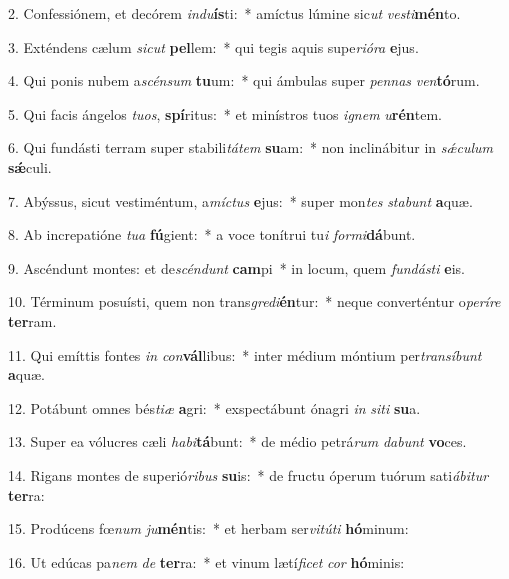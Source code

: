 2. Confessiónem, et decórem \textit{ind}\textit{u}\textbf{ís}ti:~*  amíctus lúmine sic\textit{ut} \textit{ves}\textit{ti}\textbf{mén}to.\

3. Exténdens cælum \textit{sic}\textit{ut} \textbf{pel}lem:~*  qui tegis aquis supe\textit{ri}\textit{ó}\textit{ra} \textbf{e}jus.\

4. Qui ponis nubem a\textit{scén}\textit{sum} \textbf{tu}um:~*  qui ámbulas super \textit{pen}\textit{nas} \textit{ven}\textbf{tó}rum.\

5. Qui facis ángelos \textit{tu}\textit{os}, \textbf{spí}ritus:~*  et minístros tuos \textit{i}\textit{gnem} \textit{u}\textbf{rén}tem.\

6. Qui fundásti terram super stabili\textit{tá}\textit{tem} \textbf{su}am:~*  non inclinábitur in \textit{sǽ}\textit{cu}\textit{lum} \textbf{sǽ}culi.\

7. Abýssus, sicut vestiméntum, a\textit{míc}\textit{tus} \textbf{e}jus:~*  super mon\textit{tes} \textit{sta}\textit{bunt} \textbf{a}quæ.\

8. Ab increpatióne \textit{tu}\textit{a} \textbf{fú}gient:~*  a voce tonítrui tu\textit{i} \textit{for}\textit{mi}\textbf{dá}bunt.\

9. Ascéndunt montes: et de\textit{scén}\textit{dunt} \textbf{cam}pi~*  in locum, quem \textit{fun}\textit{dás}\textit{ti} \textbf{e}is.\

10. Términum posuísti, quem non trans\textit{gre}\textit{di}\textbf{én}tur:~*  neque converténtur o\textit{pe}\textit{rí}\textit{re} \textbf{ter}ram.\

11. Qui emíttis fontes \textit{in} \textit{con}\textbf{vál}libus:~*  inter médium móntium per\textit{trans}\textit{í}\textit{bunt} \textbf{a}quæ.\

12. Potábunt omnes bés\textit{ti}\textit{æ} \textbf{a}gri:~*  exspectábunt ónagri \textit{in} \textit{si}\textit{ti} \textbf{su}a.\

13. Super ea vólucres cæli \textit{ha}\textit{bi}\textbf{tá}bunt:~*  de médio petrá\textit{rum} \textit{da}\textit{bunt} \textbf{vo}ces.\

14. Rigans montes de superió\textit{ri}\textit{bus} \textbf{su}is:~*  de fructu óperum tuórum sati\textit{á}\textit{bi}\textit{tur} \textbf{ter}ra:\

15. Prodúcens fœ\textit{num} \textit{ju}\textbf{mén}tis:~*  et herbam ser\textit{vi}\textit{tú}\textit{ti} \textbf{hó}minum:\

16. Ut edúcas pa\textit{nem} \textit{de} \textbf{ter}ra:~*  et vinum lætí\textit{fi}\textit{cet} \textit{cor} \textbf{hó}minis:\

